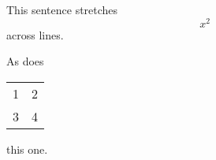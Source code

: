 This sentence stretches \[ x^2 \] across lines.

As does \begin{tabular}{cc} 1 & 2\\ 3&4\end{tabular} this one.
